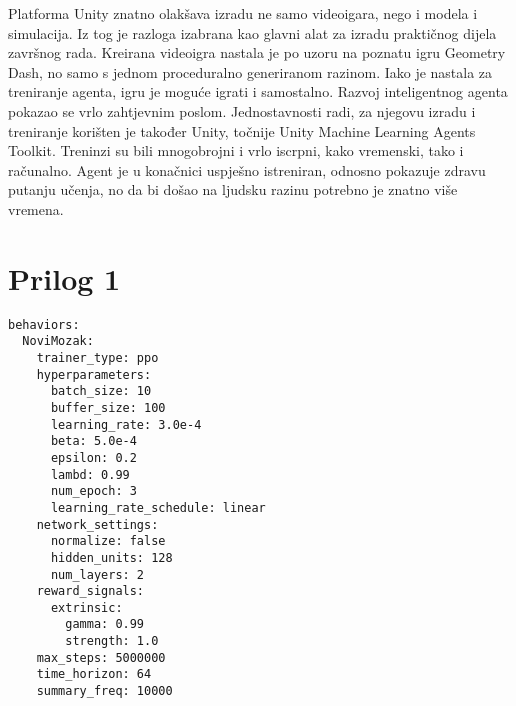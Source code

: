 \documentclass[]{foi} %
\begin{document}
Platforma Unity znatno olakšava izradu ne samo videoigara, nego i modela i simulacija. Iz tog je razloga izabrana kao glavni alat za izradu praktičnog dijela završnog rada. Kreirana videoigra nastala je po uzoru na poznatu igru Geometry Dash, no samo s jednom proceduralno generiranom razinom. Iako je nastala za treniranje agenta, igru je moguće igrati i samostalno. Razvoj inteligentnog agenta pokazao se vrlo zahtjevnim poslom. Jednostavnosti radi, za njegovu izradu i treniranje korišten je također Unity, točnije Unity Machine Learning Agents Toolkit. Treninzi su bili mnogobrojni i vrlo iscrpni, kako vremenski, tako i računalno. Agent je u konačnici uspješno istreniran, odnosno pokazuje zdravu putanju učenja, no da bi došao na ljudsku razinu potrebno je znatno više vremena. 


\makebackmatter

\appendices %

\chapter{Prilog 1} %
\label{cha: prilog 1}
\begin{lstlisting}[caption={Prikaz hiperparametara kori\v{s}tenih u treniranju agenta }] 
behaviors:
  NoviMozak:
    trainer_type: ppo
    hyperparameters:
      batch_size: 10
      buffer_size: 100
      learning_rate: 3.0e-4
      beta: 5.0e-4
      epsilon: 0.2
      lambd: 0.99
      num_epoch: 3
      learning_rate_schedule: linear
    network_settings:
      normalize: false
      hidden_units: 128
      num_layers: 2
    reward_signals:
      extrinsic:
        gamma: 0.99
        strength: 1.0
    max_steps: 5000000
    time_horizon: 64
    summary_freq: 10000
\end{lstlisting}
\end{document}
